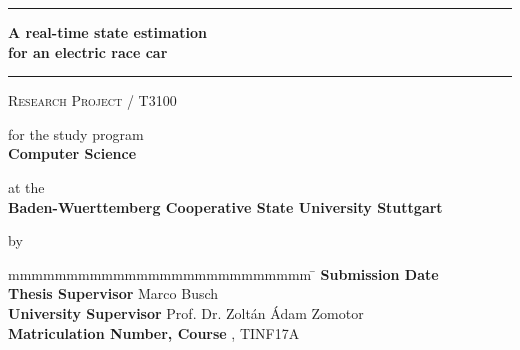 \hfill
{}

\vfill
\begin{center}
	\rule{\textwidth}{1pt}
	{
		\Huge
		\bfseries
		A real-time state estimation \\ for an electric race car
		\par
	}
	\vspace{-0.2cm} 
	\rule{\textwidth}{1pt}

	\vfill

	\textsc{Research Project / T3100}
	
	\vfill

	for the study program \\ \textbf{Computer Science}
	
	at the \\ \textbf{Baden-Wuerttemberg Cooperative State University Stuttgart}
	
	by \\ \textbf{\@author}
\end{center}

\vfill

\begin{tabbing}
	mmmmmmmmmmmmmmmmmmmmmmmmmm				\= \kill
	\textbf{Submission Date}				\> \@date \\
	\textbf{Thesis Supervisor}           	\> Marco Busch \\
	\textbf{University Supervisor}          \> Prof. Dr. Zoltán Ádam Zomotor \\
	\textbf{Matriculation Number, Course}  	, TINF17A
\end{tabbing}
